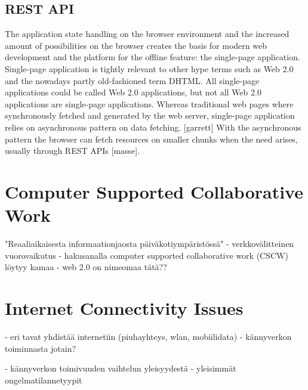 \subsection{REST API}
The application state handling on the browser environment and the increased amount of possibilities on the browser creates the basis for modern web development and the platform for the offline feature: the single-page application. Single-page application is tightly relevant to other hype terms such as Web 2.0 and the nowadays partly old-fashioned term DHTML. All single-page applications could be called Web 2.0 applications, but not all Web 2.0 applications are single-page applications. Whereas traditional web pages where synchronously fetched and generated by the web server, single-page application relies on asynchronous pattern on data fetching. [garrett] With the asynchronous pattern the browser can fetch resources on smaller chunks when the need arises, usually through REST APIs [masse].










\section{Computer Supported Collaborative Work}
"Reaaliaikaisesta informaationjaosta päiväkotiympäristössä"
- verkkovälitteinen vuorovaikutus
- hakusanalla computer supported collaborative work (CSCW) löytyy kamaa 
- web 2.0 on nimeomaa tätä??



\section{Internet Connectivity Issues}
 - eri tavat yhdistää internetiin (piuhayhteys, wlan, mobiilidata)
 - kännyverkon toiminnasta jotain?

 - kännyverkon toimivuuden vaihtelun yleisyydestä
 - yleisimmät ongelmatilannetyypit





